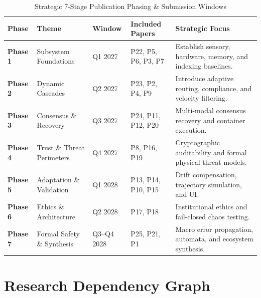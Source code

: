 \documentclass[11pt,letterpaper]{article}
\begin{document}
\begin{table}[htbp]
\centering
\small
\setlength{\tabcolsep}{4.0pt}
\caption{Strategic 7-Stage Publication Phasing \& Submission Windows}
\label{tab:publication_phases}
\begin{tabularx}{\textwidth}{>{\raggedright\arraybackslash}p{1.6cm}>{\raggedright\arraybackslash}p{3.6cm}>{\centering\arraybackslash}p{1.8cm}>{\centering\arraybackslash}p{2.4cm}>{\raggedright\arraybackslash}X}
\toprule
\textbf{Phase} & \textbf{Theme} & \textbf{Window} & \textbf{Included Papers} & \textbf{Strategic Focus} \\
\midrule
\textbf{Phase 1} & Subsystem Foundations & Q1 2027 & P22, P5, P6, P3, P7 & Establish sensory, hardware, memory, and indexing baselines. \\
\textbf{Phase 2} & Dynamic Cascades & Q2 2027 & P23, P2, P4, P9 & Introduce adaptive routing, compliance, and velocity filtering. \\
\textbf{Phase 3} & Consensus \& Recovery & Q3 2027 & P24, P11, P12, P20 & Multi-modal consensus recovery and container execution. \\
\textbf{Phase 4} & Trust \& Threat Perimeters & Q4 2027 & P8, P16, P19 & Cryptographic auditability and formal physical threat models. \\
\textbf{Phase 5} & Adaptation \& Validation & Q1 2028 & P13, P14, P10, P15 & Drift compensation, trajectory simulation, and UI. \\
\textbf{Phase 6} & Ethics \& Architecture & Q2 2028 & P17, P18 & Institutional ethics and fail-closed chaos testing. \\
\textbf{Phase 7} & Formal Safety \& Synthesis & Q3--Q4 2028 & P25, P21, P1 & Macro error propagation, automata, and ecosystem synthesis. \\
\bottomrule
\end{tabularx}
\end{table}

\section{Research Dependency Graph}
\end{document}
